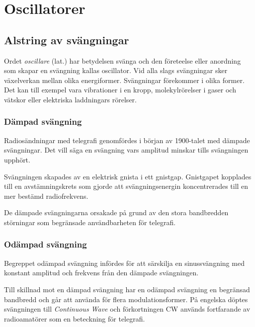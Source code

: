 \section{Oscillatorer}
\label{oscillatorer}

\subsection{Alstring av svängningar}
Ordet \emph{oscillare} (lat.) har betydelsen svänga och den företeelse
eller anordning som skapar en svängning kallas oscillator.
Vid alla slags svängningar sker växelverkan mellan olika energiformer.
Svängningar förekommer i olika former.
Det kan till exempel vara vibrationer i en kropp, molekylrörelser i gaser och
vätskor eller elektriska laddningars rörelser.


\subsubsection{Dämpad svängning}
Radiosändningar med telegrafi genomfördes i början av 1900-talet med dämpade
svängningar.
Det vill säga en svängning vars amplitud minskar tills svängningen upphört.

Svängningen skapades av en elektrisk gnista i ett gnistgap.
Gnistgapet kopplades till en avstämningskrets som gjorde att svängningsenergin
koncentrerades till en mer bestämd radiofrekvens.

De dämpade svängningarna orsakade på grund av den stora bandbredden störningar
som begränsade användbarheten för telegrafi.

\subsubsection{Odämpad svängning}
Begreppet odämpad svängning infördes för att särskilja en sinussvängning med 
konstant amplitud och frekvens från den dämpade svängningen.

Till skillnad mot en dämpad svängning har en odämpad svängning en begränsad
bandbredd och går att använda för flera modulationsformer.
På engelska döptes svängningen till \emph{Continuous Wave} och förkortningen CW
används fortfarande av radioamatörer som en beteckning för telegrafi.

